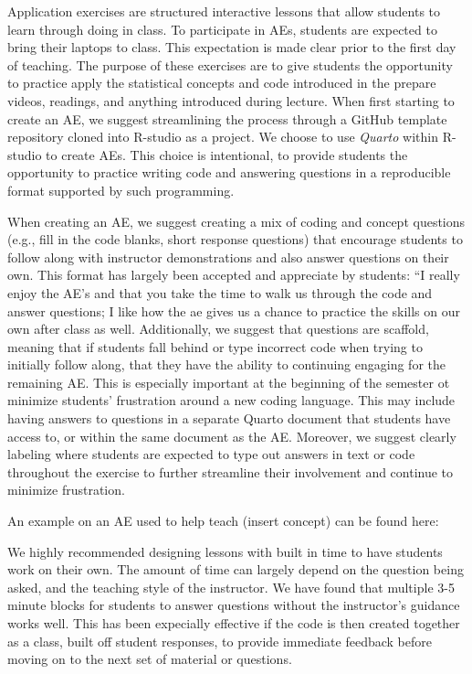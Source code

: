 \documentclass[
  12pt]{article}
\begin{document}
Application exercises are structured interactive lessons that allow
students to learn through doing in class. To participate in AEs,
students are expected to bring their laptops to class. This expectation
is made clear prior to the first day of teaching. The purpose of these
exercises are to give students the opportunity to practice apply the
statistical concepts and code introduced in the prepare videos,
readings, and anything introduced during lecture. When first starting to
create an AE, we suggest streamlining the process through a GitHub
template repository cloned into R-studio as a project. We choose to use
\emph{Quarto} within R-studio to create AEs. This choice is intentional,
to provide students the opportunity to practice writing code and
answering questions in a reproducible format supported by such
programming.

When creating an AE, we suggest creating a mix of coding and concept
questions (e.g., fill in the code blanks, short response questions) that
encourage students to follow along with instructor demonstrations and
also answer questions on their own. This format has largely been
accepted and appreciate by students: ``I really enjoy the AE's and that
you take the time to walk us through the code and answer questions; I
like how the ae gives us a chance to practice the skills on our own
after class as well. Additionally, we suggest that questions are
scaffold, meaning that if students fall behind or type incorrect code
when trying to initially follow along, that they have the ability to
continuing engaging for the remaining AE. This is especially important
at the beginning of the semester ot minimize students' frustration
around a new coding language. This may include having answers to
questions in a separate Quarto document that students have access to, or
within the same document as the AE. Moreover, we suggest clearly
labeling where students are expected to type out answers in text or code
throughout the exercise to further streamline their involvement and
continue to minimize frustration.

An example on an AE used to help teach (insert concept) can be found
here:

We highly recommended designing lessons with built in time to have
students work on their own. The amount of time can largely depend on the
question being asked, and the teaching style of the instructor. We have
found that multiple 3-5 minute blocks for students to answer questions
without the instructor's guidance works well. This has been expecially
effective if the code is then created together as a class, built off
student responses, to provide immediate feedback before moving on to the
next set of material or questions.
\end{document}
